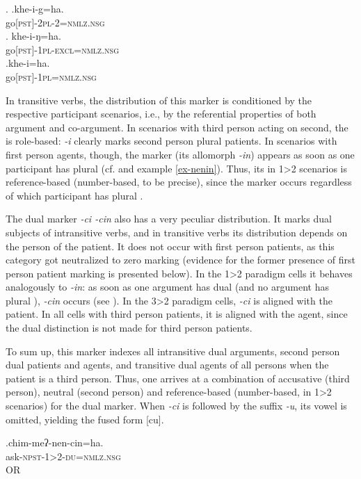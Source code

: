 	\ex. \ag.khe-i-g=ha.\\
	go{\scshape [pst]-2pl-2=nmlz.nsg}\\
	\bg. khe-i-ŋ=ha.\\
	go{\scshape [pst]-1pl-excl=nmlz.nsg}\\
	\bg.khe-i=ha.\\
	go{\scshape [pst]-1pl=nmlz.nsg}\\

In transitive verbs, the distribution of this marker is conditioned by the respective participant  scenarios, i.e., by the referential properties of both argument and co-argument. In scenarios with third person acting on second, the  is role-based: \emph{-i} clearly marks second person plural patients. In scenarios with first person agents, though, the marker (its allomorph \emph{-in}) appears as soon as one parti\-cipant has plural   (cf.  and example \ref{ex-nenin}). Thus, its  in 1>2 scenarios is reference-based (number-based, to be precise), since the marker occurs regardless of which participant has plural . 

The dual marker \emph{-ci \ti -cin} also has a very peculiar distribution. It marks dual subjects of intransitive verbs, and in transitive verbs its distribution  depends on the person of the patient. It does not occur with first person patients, as this category got neutralized to zero marking (evidence for the former presence of first person patient marking is presented below). In the 1>2 paradigm cells it behaves analogously to \emph{-in}: as soon as one argument has dual   (and no argument has plural ), \emph{-cin} occurs (see \Next). In the 3>2 paradigm cells, \emph{-ci} is aligned with the patient. In all cells with third person patients, it is aligned with the agent, since the dual distinction is not made for third person patients. 

To sum up, this marker indexes all intransitive dual arguments,  second person dual patients and agents, and transitive dual agents of all persons when the patient is a third person. Thus, one arrives at a combination of accusative (third person), neutral (second person) and reference-based (number-based, in 1>2 scenarios)  for the dual marker. When \emph{-ci} is followed by the suffix \emph{-u}, its vowel is omitted, yielding the fused form [cu].

\exg.chim-meʔ-nen-cin=ha.\\
ask{\scshape -npst-1>2-du=nmlz.nsg}\\
 OR\\

